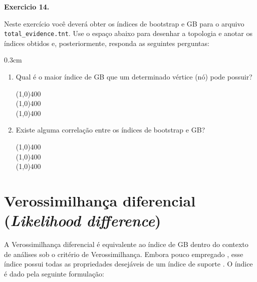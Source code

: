 \begin{refsection}
\begin{blackBlock}{\textbf{Exercicio 14.}}\label{tut14:ex:14.4}

Neste exercício você deverá obter os índices de bootstrap e GB para o arquivo \texttt{total\_evidence.tnt}. Use o espaço abaixo para desenhar a topologia e anotar os índices obtidos e, posteriormente, responda as seguintes perguntas:

\end{blackBlock}

\vspace{120pt}


\begin {myindentpar}{0.3cm}
\begin{enumerate}[\itshape i.]

	\item{Qual é o maior índice de GB que um determinado vértice (nó) pode possuir?}


\begin{center}
\line(1,0){400}\\
\line(1,0){400}\\
\line(1,0){400}\\
\end{center}


	\item{Existe alguma correlação entre os índices de bootstrap e GB?}

\begin{center}
\line(1,0){400}\\
\line(1,0){400}\\
\line(1,0){400}\\
\end{center}

\end{enumerate}
\end{myindentpar}

\section{Verossimilhança diferencial (\textit{Likelihood difference})}\label{tut14:lkr}

A Verossimilhança diferencial é equivalente ao índice de GB dentro do contexto de análises sob o critério de Verossimilhança. Embora pouco empregado \parencite[veja referências em][]{GrantKluge2008b}, esse índice possui todas as propriedades desejáveis de um índice de suporte \parencite[][]{Edwards_1992,GrantKluge2008b}. O índice é dado pela seguinte formulação:


\end{refsection}
